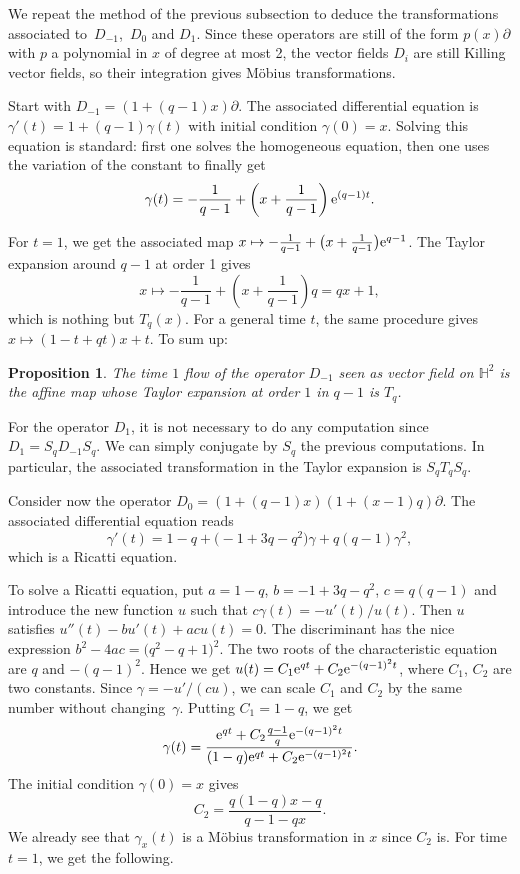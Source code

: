\documentclass[pdftex]{sigma}
\numberwithin{equation}{section}
\newtheorem{Proposition}[Theorem]{Proposition}
 { \theoremstyle{definition}
\newtheorem{Definition}[Theorem]{Definition}
\newtheorem{Note}[Theorem]{Note}
\newtheorem{Example}[Theorem]{Example}
\newtheorem{Remark}[Theorem]{Remark} }
\renewcommand*{\H}{\mathbb{H}}
\begin{document}
We repeat the method of the previous subsection to deduce the transformations associated to~$D_{-1}$,~$D_0$ and $D_1$. Since these operators are still of the form $p(x)\partial$ with $p$ a polynomial in $x$ of degree at most 2, the vector fields $D_i$ are still Killing vector fields, so their integration gives M\"obius transformations.

Start with $D_{-1}\!=\!(1+(q-1)x)\partial$. The associated differential equation is ${\gamma'(t)=1+(q-1)\gamma(t)}$ with initial condition $\gamma(0)=x$. Solving this equation is standard: first one solves the homogeneous equation, then one uses the variation of the constant to finally get
\[
\gamma(t)=-\frac{1}{q-1}+\left(x+\frac{1}{q-1}\right){\rm e}^{(q-1)t}.
\]

For $t=1$, we get the associated map $x\mapsto -\tfrac{1}{q-1}+\big(x+\tfrac{1}{q-1}\big){\rm e}^{q-1}$. The Taylor expansion around $q-1$ at order 1 gives
\[
x\mapsto -\frac{1}{q-1}+\left(x+\frac{1}{q-1}\right)q = qx+1,
\]
which is nothing but $T_q(x)$.
For a general time $t$, the same procedure gives $x\mapsto (1-t+qt)x+t$. To sum up:
\begin{Proposition}
The time $1$ flow of the operator $D_{-1}$ seen as vector field on $\H^2$ is the affine map  whose Taylor expansion at order $1$ in $q-1$ is $T_q$.
\end{Proposition}

For the operator $D_1$, it is not necessary to do any computation since $D_1=S_qD_{-1}S_q$. We can simply conjugate by $S_q$ the previous computations. In particular, the associated transformation in the Taylor expansion is $S_qT_qS_q$.

Consider now the operator $D_0=(1+(q-1)x)(1+(x-1)q)\partial$. The associated differential equation reads
\[
\gamma'(t)=1-q+\bigl(-1+3q-q^2\bigr)\gamma+q(q-1)\gamma^2,
\]
which is a Ricatti equation.

To solve a Ricatti equation, put $a=1-q$, $b=-1+3q-q^2$, $c=q(q-1)$ and introduce the new function $u$ such that $c\gamma(t)=-u'(t)/u(t)$. Then $u$ satisfies $u''(t)-bu'(t)+acu(t) = 0$. The discriminant has the nice expression $b^2-4ac=\big(q^2-q+1\big)^2$. The two roots of the characteristic equation are $q$ and $-(q-1)^2$. Hence we get $u(t)=C_1 {\rm e}^{qt}+C_2 {\rm e}^{-(q-1)^2t}$,
where $C_1$, $C_2$ are two constants. Since $\gamma=-u'/(cu)$, we can scale $C_1$ and $C_2$ by the same number without changing~$\gamma$. Putting $C_1=1-q$, we get
\[
\gamma(t)=\frac{{\rm e}^{qt}+C_2 \frac{q-1}{q}{\rm e}^{-(q-1)^2t}}{(1-q){\rm e}^{qt}+C_2 {\rm e}^{-(q-1)^2t}}.
\]
The initial condition $\gamma(0)=x$ gives
\[
C_2=\frac{q(1-q)x-q}{q-1-qx}.
\]
We already see that $\gamma_x(t)$ is a M\"obius transformation in $x$ since $C_2$ is. For time $t=1$, we get the following.
\end{document}
